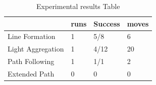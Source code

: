 \begin{table}[h]
	\caption{Experimental results Table}
	
	\begin{tabular}{ p{2.2cm}  p{1.2cm}  p{1.2cm} p{1.2cm}}
		\hline
							& runs 	& Success & moves \\
		\hline
		Line Formation		&  1 		& 5/8 		& 6\\
		Light Aggregation 	&  1 		& 4/12 		& 20\\		
		Path Following		&  1 		& 1/1 		& 2 \\
		Extended Path		&	0		&0			& 0\\

	\end{tabular}
	
	\label{tab:info}
\end{table}

